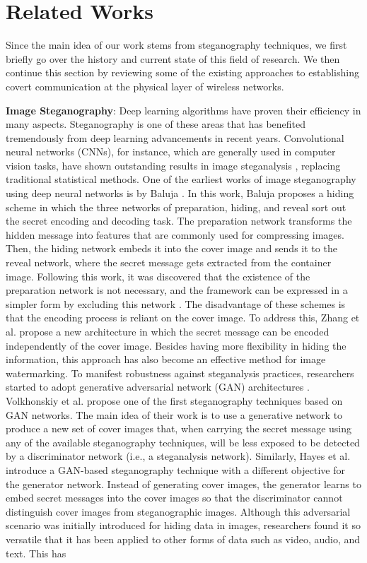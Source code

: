 \section{Related Works}
\label{s:related}
Since the main idea of our work stems from steganography techniques, we first briefly go over the history and current state of this field of research. We then continue this section by reviewing some of the existing approaches to establishing covert communication at the physical layer of wireless networks.

\textbf{Image Steganography}: Deep learning algorithms have proven their efficiency in many aspects. Steganography is one of these areas that has benefited tremendously from deep learning advancements in recent years. Convolutional neural networks (CNNs), for instance, which are generally used in computer vision tasks, have shown outstanding results in image steganalysis \cite{tan2014stacked,qian2015deep,xu2016structural}, replacing traditional statistical methods. One of the earliest works of image steganography using deep neural networks is by Baluja \cite{baluja2017hiding}. In this work, Baluja proposes a hiding scheme in which the three networks of preparation, hiding, and reveal sort out the secret encoding and decoding task. The preparation network transforms the hidden message into features that are commonly used for compressing images. Then, the hiding network embeds it into the cover image and sends it to the reveal network, where the secret message gets extracted from the container image. Following this work, it was discovered that the existence of the preparation network is not necessary, and the framework can be expressed in a simpler form by excluding this network \cite{zhang2021brief}. The disadvantage of these schemes is that the encoding process is reliant on the cover image. To address this, Zhang et al. \cite{zhang2020udh} propose a new architecture in which the secret message can be encoded independently of the cover image. Besides having more flexibility in hiding the information, this approach has also become an effective method for image watermarking. To manifest robustness against steganalysis practices, researchers started to adopt generative adversarial network (GAN) architectures \cite{goodfellow2014generative}. Volkhonskiy et al. \cite{volkhonskiy2020steganographic} propose one of the first steganography techniques based on GAN networks. The main idea of their work is to use a generative network to produce a new set of cover images that, when carrying the secret message using any of the available steganography techniques, will be less exposed to be detected by a discriminator network (i.e., a steganalysis network). Similarly, Hayes et al. \cite{hayes2017generating} introduce a GAN-based steganography technique with a different objective for the generator network. Instead of generating cover images, the generator learns to embed secret messages into the cover images so that the discriminator cannot distinguish cover images from steganographic images. Although this adversarial scenario was initially introduced for hiding data in images, researchers found it so versatile that it has been applied to other forms of data such as video, audio, and text. This has 